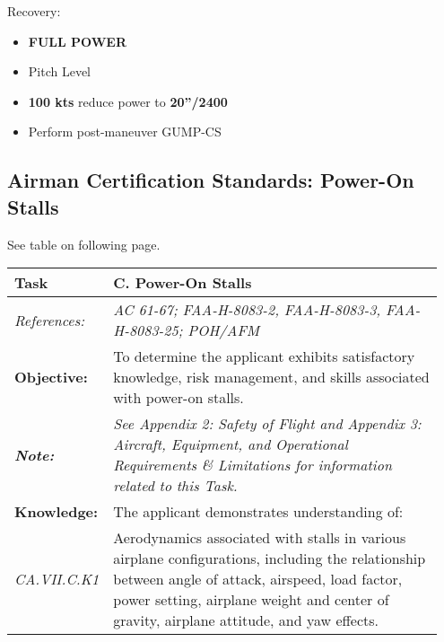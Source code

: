 {Recovery:
\begin{itemize}[label={}]
\item \textbf{FULL POWER}
\item Pitch Level
\item \textbf{100 kts} reduce power to \textbf{20''/2400}
\item Perform post-maneuver GUMP-CS
\end{itemize}

\subsection{Airman Certification Standards: Power-On Stalls}

See table on following page.

\begin{table}[]
\begin{tabular}%
  {>{\raggedleft\arraybackslash}p{0.15\linewidth}%
   >{\raggedright\arraybackslash}p{0.8\linewidth}%
  }
\textbf{Task}           & \textbf{C. Power-On Stalls}                                                                                                                                                                                                                  \\ \hline
\textit{References:}    & \textit{AC 61-67; FAA-H-8083-2, FAA-H-8083-3, FAA-H-8083-25; POH/AFM}                                                                                                                                                                        \\
\textbf{Objective:}     & To determine the applicant exhibits satisfactory knowledge, risk management, and skills associated with power-on stalls.                                                                                                                     \\
\textit{\textbf{Note:}} & \textit{See Appendix 2: Safety of Flight and Appendix 3: Aircraft, Equipment, and Operational Requirements \& Limitations for information related to this Task.}                                                                             \\ \hline
\textbf{Knowledge:}     & The applicant demonstrates understanding of:                                                                                                                                                                                                 \\
\textit{CA.VII.C.K1}    & Aerodynamics associated with stalls in various airplane configurations, including the relationship between angle of attack, airspeed, load factor, power setting, airplane weight and center of gravity, airplane attitude, and yaw effects. \\

\end{tabular}
\end{table}}
